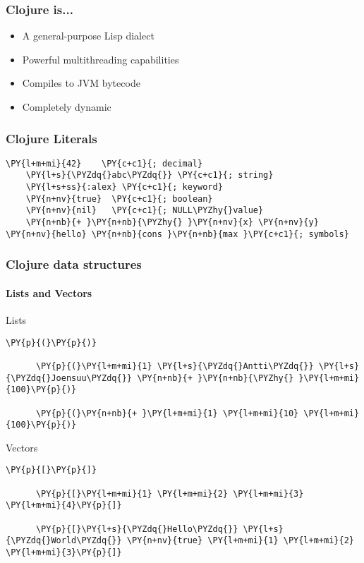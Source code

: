 \begin{frame}
  \frametitle{Clojure is...}


  \begin{itemize}[<+->]
    \item<1-> A general-purpose Lisp dialect
    \item<2-> Powerful multithreading capabilities
    \item<3-> Compiles to JVM bytecode
    \item<4-> Completely dynamic
  \end{itemize}
\end{frame}


\begin{frame}[fragile]
  \frametitle{Clojure Literals}
  \begin{Verbatim}[commandchars=\\\{\}]
    \PY{l+m+mi}{42}    \PY{c+c1}{; decimal}
    \PY{l+s}{\PYZdq{}abc\PYZdq{}} \PY{c+c1}{; string}
    \PY{l+s+ss}{:alex} \PY{c+c1}{; keyword}
    \PY{n+nv}{true}  \PY{c+c1}{; boolean}
    \PY{n+nv}{nil}   \PY{c+c1}{; NULL\PYZhy{}value}
    \PY{n+nb}{+ }\PY{n+nb}{\PYZhy{} }\PY{n+nv}{x} \PY{n+nv}{y} \PY{n+nv}{hello} \PY{n+nb}{cons }\PY{n+nb}{max }\PY{c+c1}{; symbols}
  \end{Verbatim}
\end{frame}


\begin{frame}[fragile]
  \frametitle{Clojure data structures}
  \framesubtitle{Lists and Vectors}

  \begin{block}{Lists}
    \begin{Verbatim}[commandchars=\\\{\}]
      \PY{p}{(}\PY{p}{)}

      \PY{p}{(}\PY{l+m+mi}{1} \PY{l+s}{\PYZdq{}Antti\PYZdq{}} \PY{l+s}{\PYZdq{}Joensuu\PYZdq{}} \PY{n+nb}{+ }\PY{n+nb}{\PYZhy{} }\PY{l+m+mi}{100}\PY{p}{)}

      \PY{p}{(}\PY{n+nb}{+ }\PY{l+m+mi}{1} \PY{l+m+mi}{10} \PY{l+m+mi}{100}\PY{p}{)}
    \end{Verbatim}
  \end{block}

  \begin{block}{Vectors}
    \begin{Verbatim}[commandchars=\\\{\}]
      \PY{p}{[}\PY{p}{]}

      \PY{p}{[}\PY{l+m+mi}{1} \PY{l+m+mi}{2} \PY{l+m+mi}{3} \PY{l+m+mi}{4}\PY{p}{]}

      \PY{p}{[}\PY{l+s}{\PYZdq{}Hello\PYZdq{}} \PY{l+s}{\PYZdq{}World\PYZdq{}} \PY{n+nv}{true} \PY{l+m+mi}{1} \PY{l+m+mi}{2} \PY{l+m+mi}{3}\PY{p}{]}
    \end{Verbatim}
  \end{block}
\end{frame}


